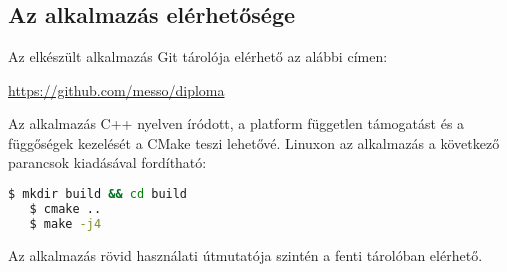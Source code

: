 \appendix
\chapter*{\fuggelek}
\setcounter{chapter}{6}  %
\setcounter{equation}{0} %

\section{Az alkalmazás elérhetősége}

Az elkészült alkalmazás Git tárolója elérhető az alábbi címen: 

\url{https://github.com/messo/diploma}

Az alkalmazás C++ nyelven íródott, a platform független támogatást és a függőségek kezelését a CMake teszi lehetővé. Linuxon az alkalmazás a következő parancsok kiadásával fordítható:

\begin{lstlisting}[language=bash,basicstyle=\ttfamily\small]
   $ mkdir build && cd build
   $ cmake ..
   $ make -j4
\end{lstlisting}

Az alkalmazás rövid használati útmutatója szintén a fenti tárolóban elérhető.

